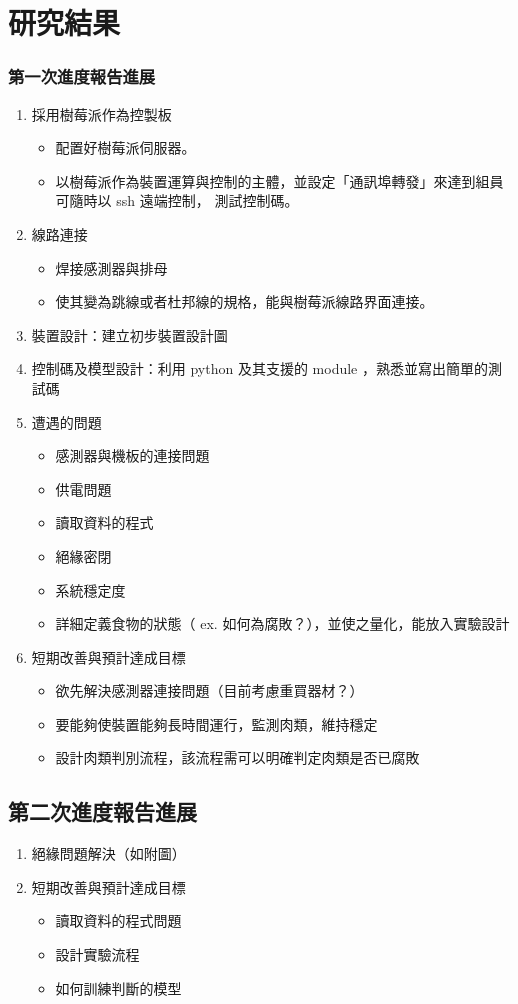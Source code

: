 \chapter{研究結果}

\subsection{第一次進度報告進展}
\begin{enumerate}
	\item 採用樹莓派作為控製板 \begin{itemize}
		\item 配置好樹莓派伺服器。
		\item 以樹莓派作為裝置運算與控制的主體，並設定「通訊埠轉發」來達到組員可隨時以 ssh 遠端控制，
			測試控制碼。 
	\end{itemize}
	\item 線路連接 \begin{itemize}
		\item 焊接感測器與排母
		\item 使其變為跳線或者杜邦線的規格，能與樹莓派線路界面連接。
	\end{itemize}
	\item 裝置設計：建立初步裝置設計圖
	\item 控制碼及模型設計：利用 python 及其支援的 module ，熟悉並寫出簡單的測試碼
	\item 遭遇的問題 \begin{itemize}
		\item 感測器與機板的連接問題
		\item 供電問題
		\item 讀取資料的程式
		\item 絕緣密閉
		\item 系統穩定度
		\item 詳細定義食物的狀態（ ex. 如何為腐敗？），並使之量化，能放入實驗設計
	\end{itemize}
	\item 短期改善與預計達成目標 \begin{itemize}
		\item 欲先解決感測器連接問題（目前考慮重買器材？）
		\item 要能夠使裝置能夠長時間運行，監測肉類，維持穩定
		\item 設計肉類判別流程，該流程需可以明確判定肉類是否已腐敗
	\end{itemize}
\end{enumerate}

\section{第二次進度報告進展}
\begin{enumerate}
	\item 絕緣問題解決（如附圖）
	\item 短期改善與預計達成目標 \begin{itemize}
		\item 讀取資料的程式問題
		\item 設計實驗流程
		\item 如何訓練判斷的模型
	\end{itemize}
\end{enumerate}


